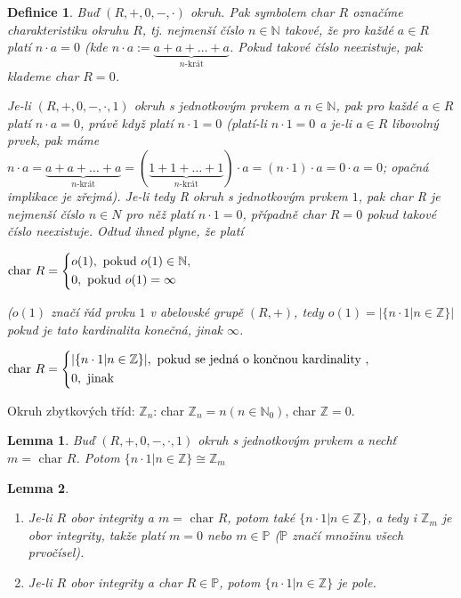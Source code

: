 \documentclass[a4paper, 11pt]{report}
\newtheorem{mydef}{Definice}[chapter]
\newtheorem{lemma}{Lemma}[chapter]
\begin{document}
\begin{mydef}
Buď $(R, +, 0, -, \cdot)$ okruh. Pak symbolem char $R$ označíme charakteristiku okruhu $R$, tj. nejmenší číslo $n \in \mathbb{N}$ takové, že pro každé $a \in R$ platí $n \cdot a = 0$ (kde $n \cdot a := \underbrace{a + a + \dots + a}_{n\text{-krát}}$. Pokud takové číslo neexistuje, pak klademe char $R = 0$.

Je-li $(R, +, 0, -, \cdot, 1)$ okruh s jednotkovým prvkem a $n \in \mathbb{N}$, pak pro každé $a \in R$ platí $n \cdot a = 0$, právě když platí $n \cdot 1 = 0$ (platí-li $n \cdot 1 = 0$ a je-li $a \in R$ libovolný prvek, pak máme $n \cdot a = \underbrace{a + a + \dots + a}_{n\text{-krát}} = (\underbrace{1 + 1 + \dots + 1}_{n\text{-krát}})\cdot a = (n \cdot 1) \cdot a = 0 \cdot a = 0$; opačná implikace je zřejmá). Je-li tedy R okruh s jednotkovým prvkem $1$, pak char R je nejmenší číslo $n \in N$ pro něž platí $n \cdot 1 = 0$, případně char $R = 0$ pokud takové číslo neexistuje. Odtud ihned plyne, že platí

$\text{char }R = \begin{dcases}
o(1), \text{ pokud } o(1) \in \mathbb{N}, \\
0, \text{ pokud } o(1) = \infty
\end{dcases}$

($o(1)$ značí řád prvku $1$ v abelovské grupě $(R, +)$, tedy $o(1) = |\{n \cdot 1 | n \in \mathbb{Z}\}|$ pokud je tato kardinalita konečná, jinak $\infty$.
\end{mydef}

$\text{char }R = \begin{dcases}
|\{n \cdot 1 | n \in \mathbb{Z}\}|, \text{ pokud se jedná o končnou kardinality }, \\
0, \text{ jinak }
\end{dcases}$

Okruh zbytkových tříd: $\mathbb{Z}_n$: char $\mathbb{Z}_n = n (n \in \mathbb{N}_0)$, char $\mathbb{Z} = 0$.

\begin{lemma}
Buď $(R, +, 0, -, \cdot, 1)$ okruh s jednotkovým prvkem a nechť $m = \text{ char }R$. Potom $\{n \cdot 1 | n \in \mathbb{Z}\} \cong \mathbb{Z}_m$
\end{lemma}

\begin{lemma}
\begin{enumerate}[1)]
	\item Je-li $R$ obor integrity a $m = \text{ char }R$, potom také $\{n \cdot 1 | n \in \mathbb{Z}\}$, a tedy i $\mathbb{Z}_m$ je obor integrity, takže platí $m=0$ nebo $m \in \mathbb{P}$ ($\mathbb{P}$ značí množinu všech prvočísel).
	\item Je-li $R$ obor integrity a char $R \in \mathbb{P}$, potom $\{n \cdot 1 | n \in \mathbb{Z}\}$ je pole.
\end{enumerate}
\end{lemma}
\end{document}
